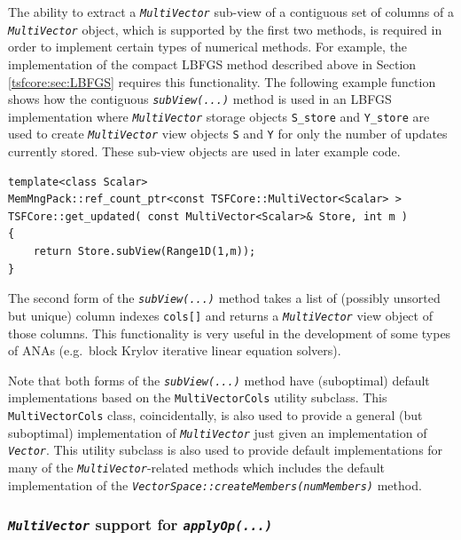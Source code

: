 \noindent The ability to extract a \texttt{\textit{Multi\-Vector}} sub-view of a
contiguous set of columns of a \texttt{\textit{Multi\-Vector}} object,
which is supported by the first two methods, is required in order to
implement certain types of numerical methods.  For example, the
implementation of the compact LBFGS method described above in Section
\ref{tsfcore:sec:LBFGS} requires this functionality.
The following example function shows how the contiguous
\texttt{\textit{subView(...)}} method is used in an LBFGS
implementation where \texttt{\textit{Multi\-Vector}} storage objects
\texttt{S\_store} and \texttt{Y\_store} are used to create
\texttt{\textit{Multi\-Vector}} view objects \texttt{S} and \texttt{Y}
for only the number of updates currently stored.  These sub-view
objects are used in later example code.

{\scriptsize\begin{verbatim}
template<class Scalar>
MemMngPack::ref_count_ptr<const TSFCore::MultiVector<Scalar> >
TSFCore::get_updated( const MultiVector<Scalar>& Store, int m )
{
    return Store.subView(Range1D(1,m));
}
\end{verbatim}}

The second form of the \texttt{\textit{subView(...)}} method takes a
list of (possibly unsorted but unique) column indexes \texttt{cols[]}
and returns a \texttt{\textit{Multi\-Vector}} view object of those
columns.  This functionality is very useful in the development of some
types of ANAs (e.g.~block Krylov iterative linear equation solvers).

Note that both forms of the \texttt{\textit{subView(...)}} method have
(suboptimal) default implementations based on the
\texttt{MultiVectorCols} utility subclass.  This
\texttt{MultiVectorCols} class, coincidentally, is also used
to provide a general (but suboptimal) implementation of
\texttt{\textit{Multi\-Vector}} just given an implementation of
\texttt{\textit{Vector}}.  This utility subclass is also used to
provide default implementations for many of the
\texttt{\textit{Multi\-Vector}}-related methods which includes
the default implementation of the
\texttt{\textit{VectorSpace\-::createMembers(numMembers)}} method.

%
\subsubsection{\texttt{\textit{Multi\-Vector}} support for \texttt{\textit{applyOp(\-...)}}}
\label{tsfcore:sec:multi_vec_apply_op}
%

